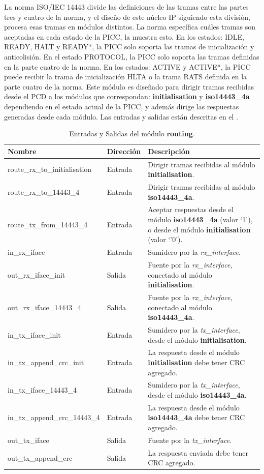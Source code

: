 \documentclass[a4paper, twoside, 11pt]{report}
\begin{document}
La norma ISO/IEC 14443 divide las definiciones de las tramas entre las partes tres y cuatro de la norma, y el diseño de este núcleo IP siguiendo esta división, procesa esas tramas en módulos distintos. La norma específica cuáles tramas son aceptadas en cada estado de la PICC, la  muestra esto. En los estados: IDLE, READY, HALT y READY*, la PICC solo soporta las tramas de inicialización y anticolisión. En el estado PROTOCOL, la PICC solo soporta las tramas definidas en la parte cuatro de la norma. En los estados: ACTIVE y ACTIVE*, la PICC puede recibir la trama de inicialización HLTA o la trama RATS definida en la parte cuatro de la norma. Este módulo es diseñado para dirigir tramas recibidas desde el PCD a los módulos que correspondan: \textbf{initialisation} y \textbf{iso14443\_4a} dependiendo en el estado actual de la PICC, y además dirige las respuestas generadas desde cada módulo. Las entradas y salidas están descritas en el .

\begin{table}[htb]
  \centering
  \tablezebra
  \begin{tabulary}{\linewidth}{l|l|L}
    \textbf{Nombre}&\textbf{Dirección}&\textbf{Descripción} \\
    \hline
    route\_rx\_to\_initialisation&Entrada&Dirigir tramas recibidas al módulo \textbf{initialisation}. \\
    route\_rx\_to\_14443\_4&Entrada&Dirigir tramas recibidas al módulo \textbf{iso14443\_4a}. \\
    route\_tx\_from\_14443\_4&Entrada&Aceptar respuestas desde el módulo \textbf{iso14443\_4a} (valor ‘1’), o desde el módulo \textbf{initialisation} (valor ‘’0’). \\
    in\_rx\_iface&Entrada&Sumidero por la \textit{rx\_interface}. \\
    out\_rx\_iface\_init&Salida&Fuente por la \textit{rx\_interface}, conectado al módulo \textbf{initialisation}. \\
    out\_rx\_iface\_14443\_4&Salida&Fuente por la \textit{rx\_interface}, conectado al módulo \textbf{iso14443\_4a}. \\
    in\_tx\_iface\_init&Entrada&Sumidero por la \textit{tx\_interface}, desde el módulo \textbf{initialisation}. \\
    in\_tx\_append\_crc\_init&Entrada&La respuesta desde el módulo \textbf{initialisation} debe tener CRC agregado. \\
    in\_tx\_iface\_14443\_4&Entrada&Sumidero por la \textit{tx\_interface}, desde el módulo \textbf{iso14443\_4a}. \\
    in\_tx\_append\_crc\_14443\_4&Entrada&La respuesta desde el módulo \textbf{iso14443\_4a} debe tener CRC agregado. \\
    out\_tx\_iface&Salida&Fuente por la \textit{tx\_interface}. \\
    out\_tx\_append\_crc&Salida&La respuesta enviada debe tener CRC agregado. \\
  \end{tabulary}
  \caption{Entradas y Salidas del módulo \textbf{routing}.}
  \label{tab:ports_routing}
\end{table}
\end{document}
